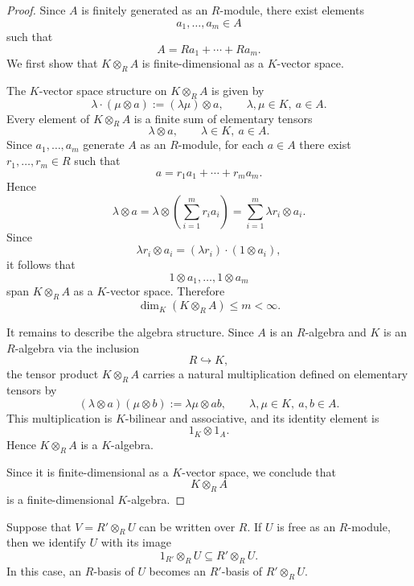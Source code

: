 \begin{proof}
    Since \(A\) is finitely generated as an \(R\)-module, there exist elements
    \[
        a_1,\dots,a_m\in A
    \]
    such that
    \[
        A=Ra_1+\cdots+Ra_m.
    \]
    We first show that \(K\otimes_R A\) is finite-dimensional as a \(K\)-vector
    space.

    The \(K\)-vector space structure on \(K\otimes_R A\) is given by
    \[
        \lambda\cdot(\mu\otimes a):=(\lambda\mu)\otimes a,
        \qquad
        \lambda,\mu\in K,\ a\in A.
    \]
    Every element of \(K\otimes_R A\) is a finite sum of elementary tensors
    \[
        \lambda\otimes a,
        \qquad \lambda\in K,\ a\in A.
    \]
    Since \(a_1,\dots,a_m\) generate \(A\) as an \(R\)-module, for each \(a\in A\)
    there exist \(r_1,\dots,r_m\in R\) such that
    \[
        a=r_1a_1+\cdots+r_ma_m.
    \]
    Hence
    \[
        \lambda\otimes a
        =
        \lambda\otimes \left(\sum_{i=1}^m r_i a_i\right)
        =
        \sum_{i=1}^m \lambda r_i\otimes a_i.
    \]
    Since
    \[
        \lambda r_i\otimes a_i
        =
        (\lambda r_i)\cdot (1\otimes a_i),
    \]
    it follows that
    \[
        1\otimes a_1,\dots,1\otimes a_m
    \]
    span \(K\otimes_R A\) as a \(K\)-vector space. Therefore
    \[
        \dim_K(K\otimes_R A)\leq m<\infty.
    \]

    It remains to describe the algebra structure. Since \(A\) is an \(R\)-algebra
    and \(K\) is an \(R\)-algebra via the inclusion
    \[
        R\hookrightarrow K,
    \]
    the tensor product \(K\otimes_R A\) carries a natural multiplication defined on
    elementary tensors by
    \[
        (\lambda\otimes a)(\mu\otimes b)
        :=
        \lambda\mu\otimes ab,
        \qquad
        \lambda,\mu\in K,\ a,b\in A.
    \]
    This multiplication is \(K\)-bilinear and associative, and its identity element is
    \[
        1_K\otimes 1_A.
    \]
    Hence \(K\otimes_R A\) is a \(K\)-algebra.

    Since it is finite-dimensional as a \(K\)-vector space, we conclude that
    \[
        K\otimes_R A
    \]
    is a finite-dimensional \(K\)-algebra.
\end{proof}

\begin{remark}
    Suppose that \(V=R'\otimes_R U\) can be written over \(R\). If \(U\) is free as
    an \(R\)-module, then we identify \(U\) with its image
    \[
        1_{R'}\otimes_R U\subseteq R'\otimes_R U.
    \]
    In this case, an \(R\)-basis of \(U\) becomes an \(R'\)-basis of
    \(R'\otimes_R U\).
\end{remark}

